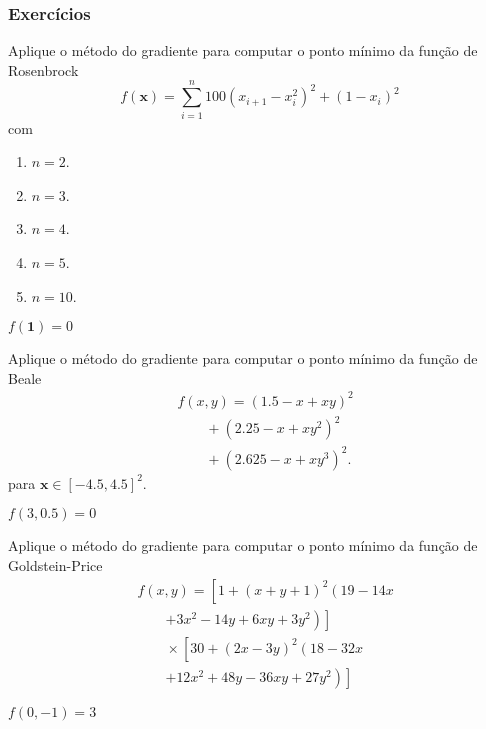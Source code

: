 \subsubsection{Exercícios}
\badgeRevisar

\begin{exer}
  Aplique o método do gradiente para computar o ponto mínimo da função de Rosenbrock{\rosenbrock}
  \begin{equation}
    f(\pmb{x}) = \sum_{i=1}^n 100\left(x_{i+1}-x_i^2\right)^2 + (1-x_i)^2
  \end{equation}
  com
  \begin{enumerate}
    \item $n = 2$.
    \item $n = 3$.
    \item $n = 4$.
    \item $n = 5$.
    \item $n = 10$.
  \end{enumerate}
\end{exer}
\begin{resp}
$f(\pmb{1}) = 0$
\end{resp}

\begin{exer}
  Aplique o método do gradiente para computar o ponto mínimo da função de Beale \cite{Beale1955a}
  \begin{equation}
    \begin{aligned}
      & f(x,y) = (1.5-x+xy)^2 \\
      &\qquad + (2.25-x+xy^2)^2 \\
      &\qquad + (2.625-x+xy^3)^2.
    \end{aligned}
  \end{equation}
  para $\pmb{x}\in [-4.5, 4.5]^2$.
\end{exer}
\begin{resp}
  $f(3, 0.5) = 0$
\end{resp}

\begin{exer}
  Aplique o método do gradiente para computar o ponto mínimo da função de Goldstein-Price \cite{Goldstein1971a}
  \begin{equation}
    \begin{aligned}
      & f(x,y) = \left[1+\left(x+y+1\right)^{2}\left(19-14x \right.\right.\\
      &\qquad \left.\left.+ 3x^{2}-14y+6xy+3y^{2}\right)\right] \\
      &\qquad \times \left[30+\left(2x-3y\right)^{2}\left(18-32x\right.\right.\\
      &\qquad \left.\left.+12x^{2}+48y-36xy+27y^{2}\right)\right]
    \end{aligned}  
  \end{equation}
\end{exer}
\begin{resp}
  $f(0,-1) = 3$
\end{resp}

